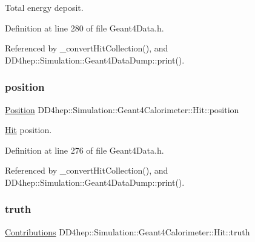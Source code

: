 Total energy deposit. 



Definition at line 280 of file Geant4\+Data.\+h.



Referenced by \+\_\+convert\+Hit\+Collection(), and D\+D4hep\+::\+Simulation\+::\+Geant4\+Data\+Dump\+::print().

\hypertarget{class_d_d4hep_1_1_simulation_1_1_geant4_calorimeter_1_1_hit_acab4633ca2b899307b1bbb47a22f0e74}{}\label{class_d_d4hep_1_1_simulation_1_1_geant4_calorimeter_1_1_hit_acab4633ca2b899307b1bbb47a22f0e74} 
\subsubsection{\texorpdfstring{position}{position}}
{\footnotesize\ttfamily \hyperlink{namespace_d_d4hep_1_1_geometry_a55083902099d03506c6db01b80404900}{Position} D\+D4hep\+::\+Simulation\+::\+Geant4\+Calorimeter\+::\+Hit\+::position}



\hyperlink{class_d_d4hep_1_1_simulation_1_1_geant4_calorimeter_1_1_hit}{Hit} position. 



Definition at line 276 of file Geant4\+Data.\+h.



Referenced by \+\_\+convert\+Hit\+Collection(), and D\+D4hep\+::\+Simulation\+::\+Geant4\+Data\+Dump\+::print().

\hypertarget{class_d_d4hep_1_1_simulation_1_1_geant4_calorimeter_1_1_hit_a7e22969405a034dc2f0deb3df1606d0d}{}\label{class_d_d4hep_1_1_simulation_1_1_geant4_calorimeter_1_1_hit_a7e22969405a034dc2f0deb3df1606d0d} 
\subsubsection{\texorpdfstring{truth}{truth}}
{\footnotesize\ttfamily \hyperlink{class_d_d4hep_1_1_simulation_1_1_geant4_hit_data_aee3759a12612c2f2712e44f87e343a2f}{Contributions} D\+D4hep\+::\+Simulation\+::\+Geant4\+Calorimeter\+::\+Hit\+::truth}



